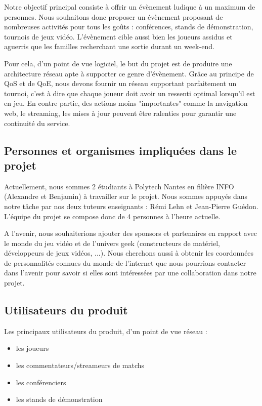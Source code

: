\documentclass[french]{article}
\begin{document}
Notre objectif principal consiste à offrir un évènement ludique à un maximum de personnes. Nous souhaitons donc proposer un évènement proposant de nombreuses activités pour tous les goûts : conférences, stands de démonstration, tournois de jeux vidéo. L'évènement cible aussi bien les joueurs assidus et aguerris que les familles recherchant une sortie durant un week-end.

Pour cela, d'un point de vue logiciel, le but du projet est de produire une architecture réseau apte à supporter ce genre d'évènement. Grâce au principe de QoS et de QoE, nous devons fournir un réseau supportant parfaitement un tournoi, c'est à dire que chaque joueur doit avoir un ressenti optimal lorsqu'il est en jeu. En contre partie, des actions moins "importantes" comme la navigation web, le streaming, les mises à jour peuvent être ralenties pour garantir une continuité du service.

\subsection{Personnes et organismes impliquées dans le projet}

Actuellement, nous sommes 2 étudiants à Polytech Nantes en filière INFO (Alexandre et Benjamin) à travailler sur le projet.
Nous sommes appuyés dans notre tâche par nos deux tuteurs enseignants : Rémi Lehn et Jean-Pierre Guédon.
L'équipe du projet se compose donc de 4 personnes à l'heure actuelle.

A l'avenir, nous souhaiterions ajouter des sponsors et partenaires en rapport avec le monde du jeu vidéo et de l'univers geek (constructeurs de matériel, développeurs de jeux vidéos, ...).
Nous cherchons aussi à obtenir les coordonnées de personnalités connues du monde de l'internet que nous pourrions contacter dans l'avenir pour savoir si elles sont intéressées par une collaboration dans notre projet.

\subsection{Utilisateurs du produit}

Les principaux utilisateurs du produit, d'un point de vue réseau :
\begin{itemize}
	\item les joueurs
	\item les commentateurs/streameurs de matchs
	\item les conférenciers
	\item les stands de démonstration
\end{itemize}
\end{document}
